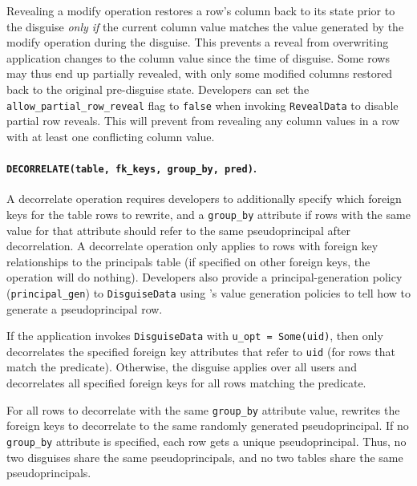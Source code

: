 %
Revealing a modify operation restores a row's column back to its state prior
to the disguise \emph{only if} the current column value matches the value
generated by the modify operation during the disguise. This prevents a reveal
from overwriting application changes to the column value since the time of
disguise.
%
Some rows may thus end up partially revealed, with only some modified columns
restored back to the original pre-disguise state.  Developers can set the
\texttt{allow\_partial\_row\_reveal} flag to \texttt{false} when invoking
\texttt{RevealData} to disable partial row reveals. This will prevent \sys from
revealing any column values in a row with at least one conflicting column value.
%

%
\paragraph{\texttt{DECORRELATE(table, fk\_keys, group\_by, pred)}.}
%
A decorrelate operation requires developers to additionally specify which
foreign keys for the table rows to rewrite, and a \texttt{group\_by} attribute
if rows with the same value for that attribute should refer to the same
pseudoprincipal after decorrelation.
%
A decorrelate operation only applies to rows with foreign key relationships to
the principals table (if specified on other foreign keys, the operation will do
nothing).
%
Developers also provide a principal-generation policy
(\texttt{principal\_gen}) to \texttt{DisguiseData} using \sys's value generation
policies to tell \sys how to generate a pseudoprincipal row.
%

%
If the application invokes \texttt{DisguiseData} with \texttt{u\_opt =
Some(uid)}, then \sys only decorrelates the specified foreign key attributes
that refer to \texttt{uid} (for rows that match the predicate). 
%
Otherwise, the disguise applies over all users and \sys decorrelates all
specified foreign keys for all rows matching the predicate.
%

%
For all rows to decorrelate with the same \texttt{group\_by} attribute value,
\sys rewrites the foreign keys to decorrelate to the same randomly generated
pseudoprincipal.
%
If no \texttt{group\_by} attribute is specified, each row gets a unique
pseudoprincipal.
%
Thus, no two disguises share the same pseudoprincipals, and no two tables share
the same pseudoprincipals.
%


